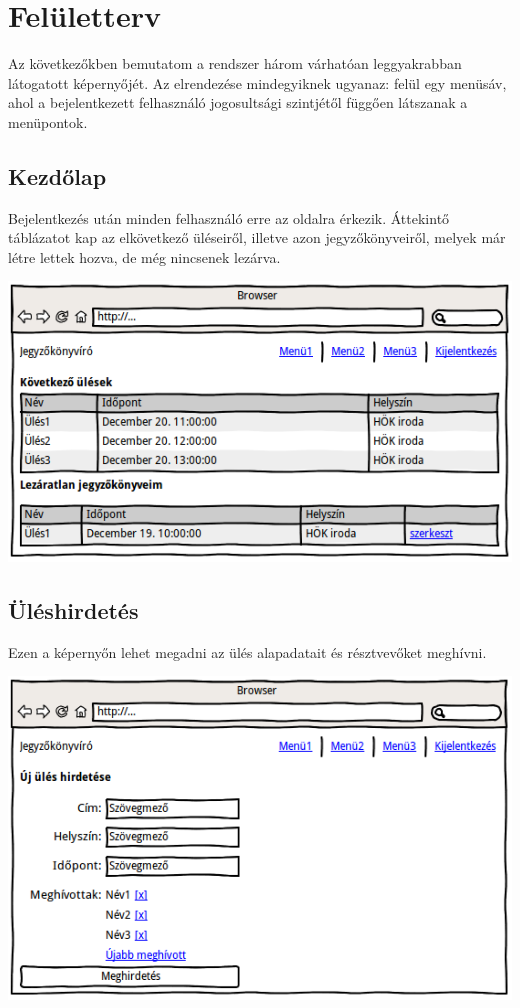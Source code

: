 \documentclass[a4paper,12pt,oneside]{report}
\begin{document}
\section{Felületterv}

Az következőkben bemutatom a rendszer három várhatóan leggyakrabban látogatott képernyőjét. Az elrendezése mindegyiknek ugyanaz: felül egy menüsáv, ahol a bejelentkezett felhasználó jogosultsági szintjétől függően látszanak a menüpontok.

\subsection{Kezdőlap}

Bejelentkezés után minden felhasználó erre az oldalra érkezik. Áttekintő táblázatot kap az elkövetkező üléseiről, illetve azon jegyzőkönyveiről, melyek már létre lettek hozva, de még nincsenek lezárva.

\includegraphics[width=\textwidth]{wireframe-kezdolap}

\subsection{Üléshirdetés}

Ezen a képernyőn lehet megadni az ülés alapadatait és résztvevőket meghívni.

\includegraphics[width=\textwidth]{wireframe-uleshirdetes}
\end{document}
